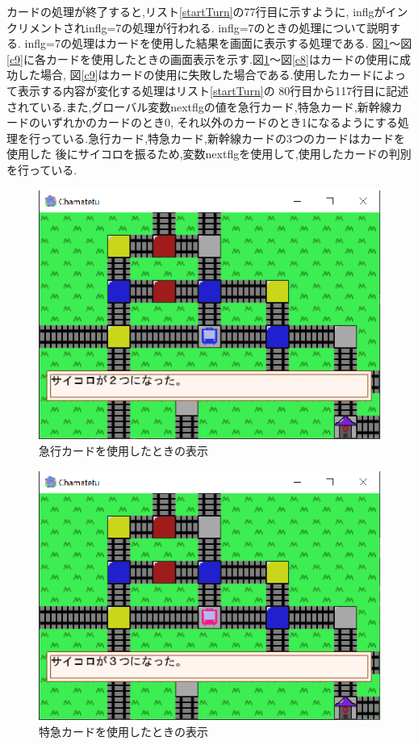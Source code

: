 \documentclass[a4j]{jarticle}
\begin{document}
        カードの処理が終了すると,リスト\ref{startTurn}の77行目に示すように, inflgがインクリメントされinflg=7の処理が行われる.
        inflg=7のときの処理について説明する. inflg=7の処理はカードを使用した結果を画面に表示する処理である. 
        図\ref{c1}～図\ref{c9}に各カードを使用したときの画面表示を示す.図\ref{c1}～図\ref{c8}はカードの使用に成功した場合,
        図\ref{c9}はカードの使用に失敗した場合である.使用したカードによって表示する内容が変化する処理はリスト\ref{startTurn}の
        80行目から117行目に記述されている.また,グローバル変数nextflgの値を急行カード,特急カード,新幹線カードのいずれかのカードのとき0,
        それ以外のカードのとき1になるようにする処理を行っている.急行カード,特急カード,新幹線カードの3つのカードはカードを使用した
        後にサイコロを振るため,変数nextflgを使用して,使用したカードの判別を行っている.

        \begin{figure}[H]
            \centering
            \includegraphics[scale=1.3]{kyukou.eps}
            \caption{急行カードを使用したときの表示}
             \label{c1}
            \end{figure}   

        \begin{figure}[H]
            \centering
            \includegraphics[scale=1.3]{tokkyu.eps}
            \caption{特急カードを使用したときの表示}
             \label{c2}
            \end{figure}  
\end{document}
